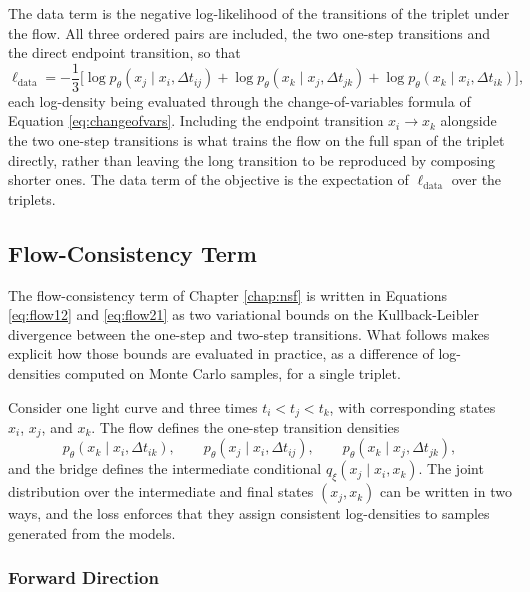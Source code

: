 The data term is the negative log-likelihood of the transitions of the triplet under the flow. All three ordered pairs are included, the two one-step transitions and the direct endpoint transition, so that
\begin{equation}
    \label{eq:app_ldata}
    \ell_\mathrm{data} = -\frac{1}{3}\Big[
        \log p_\theta(x_j \mid x_i, \Delta t_{ij})
        + \log p_\theta(x_k \mid x_j, \Delta t_{jk})
        + \log p_\theta(x_k \mid x_i, \Delta t_{ik})
    \Big],
\end{equation}
each log-density being evaluated through the change-of-variables formula of Equation \ref{eq:changeofvars}. Including the endpoint transition $x_i \rightarrow x_k$ alongside the two one-step transitions is what trains the flow on the full span of the triplet directly, rather than leaving the long transition to be reproduced by composing shorter ones. The data term of the objective is the expectation of $\ell_\mathrm{data}$ over the triplets.

\subsection{Flow-Consistency Term}

The flow-consistency term of Chapter \ref{chap:nsf} is written in Equations \ref{eq:flow12} and \ref{eq:flow21} as two variational bounds on the Kullback-Leibler divergence between the one-step and two-step transitions. What follows makes explicit how those bounds are evaluated in practice, as a difference of log-densities computed on Monte Carlo samples, for a single triplet.

Consider one light curve and three times $t_i < t_j < t_k$, with corresponding states $x_i$, $x_j$, and $x_k$. The flow defines the one-step transition densities
\begin{equation}
    \label{eq:app_onestep}
    p_\theta(x_k \mid x_i, \Delta t_{ik}), \qquad
    p_\theta(x_j \mid x_i, \Delta t_{ij}), \qquad
    p_\theta(x_k \mid x_j, \Delta t_{jk}),
\end{equation}
and the bridge defines the intermediate conditional $q_\xi(x_j \mid x_i, x_k)$. The joint distribution over the intermediate and final states $(x_j, x_k)$ can be written in two ways, and the loss enforces that they assign consistent log-densities to samples generated from the models.

\subsubsection{Forward Direction}

